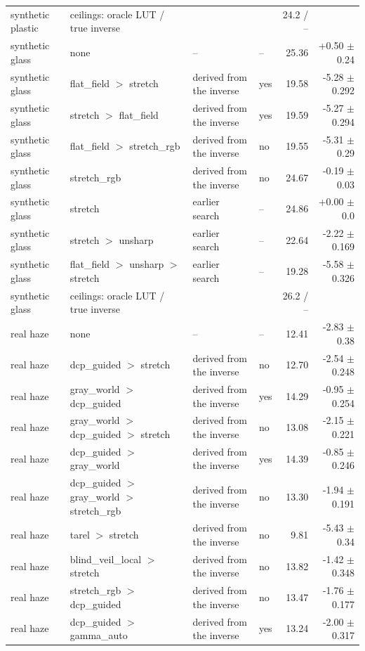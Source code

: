 \begin{tabular}{llllrr}
synthetic plastic & ceilings: oracle LUT / true inverse &  &  & 24.2 / -- &  \\
synthetic glass & none & -- & -- & 25.36 & +0.50 $\pm$ 0.24 \\
synthetic glass & flat\_field $>$ stretch & derived from the inverse & yes & 19.58 & -5.28 $\pm$ 0.292 \\
synthetic glass & stretch $>$ flat\_field & derived from the inverse & yes & 19.59 & -5.27 $\pm$ 0.294 \\
synthetic glass & flat\_field $>$ stretch\_rgb & derived from the inverse & no & 19.55 & -5.31 $\pm$ 0.29 \\
synthetic glass & stretch\_rgb & derived from the inverse & no & 24.67 & -0.19 $\pm$ 0.03 \\
synthetic glass & stretch & earlier search & -- & 24.86 & +0.00 $\pm$ 0.0 \\
synthetic glass & stretch $>$ unsharp & earlier search & -- & 22.64 & -2.22 $\pm$ 0.169 \\
synthetic glass & flat\_field $>$ unsharp $>$ stretch & earlier search & -- & 19.28 & -5.58 $\pm$ 0.326 \\
synthetic glass & ceilings: oracle LUT / true inverse &  &  & 26.2 / -- &  \\
real haze & none & -- & -- & 12.41 & -2.83 $\pm$ 0.38 \\
real haze & dcp\_guided $>$ stretch & derived from the inverse & no & 12.70 & -2.54 $\pm$ 0.248 \\
real haze & gray\_world $>$ dcp\_guided & derived from the inverse & yes & 14.29 & -0.95 $\pm$ 0.254 \\
real haze & gray\_world $>$ dcp\_guided $>$ stretch & derived from the inverse & no & 13.08 & -2.15 $\pm$ 0.221 \\
real haze & dcp\_guided $>$ gray\_world & derived from the inverse & yes & 14.39 & -0.85 $\pm$ 0.246 \\
real haze & dcp\_guided $>$ gray\_world $>$ stretch\_rgb & derived from the inverse & no & 13.30 & -1.94 $\pm$ 0.191 \\
real haze & tarel $>$ stretch & derived from the inverse & no & 9.81 & -5.43 $\pm$ 0.34 \\
real haze & blind\_veil\_local $>$ stretch & derived from the inverse & no & 13.82 & -1.42 $\pm$ 0.348 \\
real haze & stretch\_rgb $>$ dcp\_guided & derived from the inverse & no & 13.47 & -1.76 $\pm$ 0.177 \\
real haze & dcp\_guided $>$ gamma\_auto & derived from the inverse & yes & 13.24 & -2.00 $\pm$ 0.317 \\

\end{tabular}
